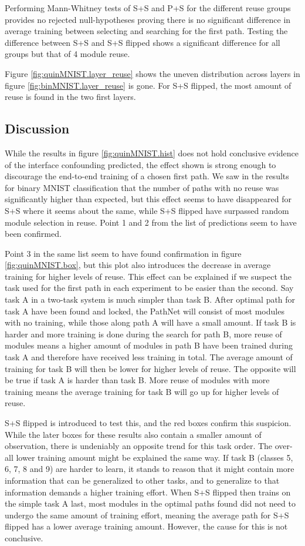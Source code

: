 Performing Mann-Whitney tests of S+S and P+S for the different reuse groups provides no rejected null-hypotheses proving there is no significant difference in average training between selecting and searching for the first path. Testing the difference between S+S and S+S flipped shows a significant difference for all groups but that of 4 module reuse. 

Figure \ref{fig:quinMNIST.layer_reuse} shows the uneven distribution across layers in figure \ref{fig:binMNIST.layer_reuse} is gone. For S+S flipped, the most amount of reuse is found in the two first layers.

\subsection{Discussion}
While the results in figure \ref{fig:quinMNIST.hist} does not hold conclusive evidence of the interface confounding predicted, the effect shown is strong enough to discourage the end-to-end training of a chosen first path. We saw in the results for binary MNIST classification that the number of paths with no reuse was significantly higher than expected, but this effect seems to have disappeared for S+S where it seems about the same, while S+S flipped have surpassed random module selection in reuse. Point 1 and 2 from the list of predictions seem to have been confirmed. 

Point 3 in the same list seem to have found confirmation in figure \ref{fig:quinMNIST.box}, but this plot also introduces the decrease in average training for higher levels of reuse. This effect can be explained if we suspect the task used for the first path in each experiment to be easier than the second. Say task A in a two-task system is much simpler than task B. After optimal path for task A have been found and locked, the PathNet will consist of most modules with no training, while those along path A will have a small amount. If task B is harder and more training is done during the search for path B, more reuse of modules means a higher amount of modules in path B have been trained during task A and therefore have received less training in total. The average amount of training for task B will then be lower for higher levels of reuse. 
The opposite will be true if task A is harder than task B. More reuse of modules with more training means the average training for task B will go up for higher levels of reuse. 

S+S flipped is introduced to test this, and the red boxes confirm this suspicion. While the later boxes for these results also contain a smaller amount of observation, there is undeniably an opposite trend for this task order. The over-all lower training amount might be explained the same way. If task B (classes 5, 6, 7, 8 and 9) are harder to learn, it stands to reason that it might contain more information that can be generalized to other tasks, and to generalize to that information demands a higher training effort. When S+S flipped then trains on the simple task A last, most modules in the optimal paths found did not need to undergo the same amount of training effort, meaning the average path for S+S flipped has a lower average training amount. However, the cause for this is not conclusive. 


